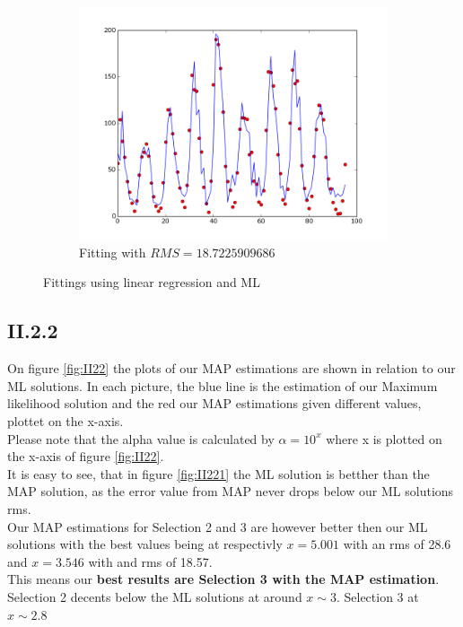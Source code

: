 \documentclass{article}
\begin{document}
\begin{figure}[!h]
\begin{subfigure}[b]{0.47\textwidth}
        \includegraphics[width=\textwidth]{Part2/II213.png}
        \caption{Fitting with $RMS = 18.7225909686$}
    \end{subfigure}
    \caption{Fittings using linear regression and ML}
    \label{fig:II21}
\end{figure}

\subsection{II.2.2}

On figure \ref{fig:II22} the plots of our MAP estimations are shown in relation
to our ML solutions. In each picture, the blue line is the estimation of    
our Maximum likelihood solution and the red our MAP estimations given 
different values, plottet on the x-axis.\\
Please note that the alpha value is calculated by $\alpha = 10^{x} $ where x    
is plotted on the x-axis of figure \ref{fig:II22}.\\
It is easy to see, that in figure \ref{fig:II221} the ML solution is
betther than the MAP solution, as the error value from MAP 
never drops below our ML solutions rms.\\
Our MAP estimations for Selection 2 and 3 are however better then our ML solutions with the 
best values being at respectivly $x = 5.001$ with an rms of 28.6 and $x = 3.546$ with and rms of 18.57.\\
This means our \textbf{best results are Selection 3 with the MAP estimation}.
Selection 2 decents below the ML solutions at around $x \sim 3$. Selection 3 at $x \sim 2.8$
\end{document}
